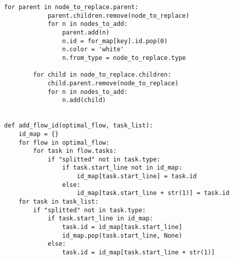 \documentclass[a4paper,11pt,twoside]{book}
\begin{document}
\begin{lstlisting}[language=CCC, caption=pargraph.py]
		for parent in node_to_replace.parent:
			parent.children.remove(node_to_replace)
			for n in nodes_to_add:
				parent.add(n)
				n.id = for_map[key].id.pop(0)
				n.color = 'white'
				n.from_type = node_to_replace.type

		for child in node_to_replace.children:
			child.parent.remove(node_to_replace)
			for n in nodes_to_add:
				n.add(child) 


def add_flow_id(optimal_flow, task_list):
	id_map = {}
	for flow in optimal_flow:
		for task in flow.tasks:
			if "splitted" not in task.type:
				if task.start_line not in id_map:
					id_map[task.start_line] = task.id
				else:
					id_map[task.start_line + str(1)] = task.id
	for task in task_list:
		if "splitted" not in task.type:
			if task.start_line in id_map:
				task.id = id_map[task.start_line]
				id_map.pop(task.start_line, None)
			else:
				task.id = id_map[task.start_line + str(1)]

\end{lstlisting}
\end{document}
